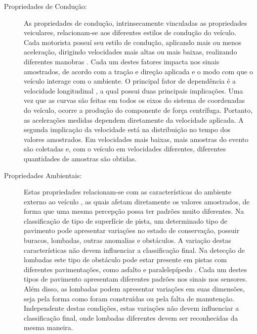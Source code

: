\begin{description}
	\item [Propriedades de Condução:] 
	
	As propriedades de condução, intrinsecamente vinculadas as propriedades veiculares, relacionam-se aos diferentes estilos de condução do veículo.  Cada motorista possuí seu estilo de condução, aplicando mais ou menos aceleração, dirigindo velocidades mais altas ou mais baixas, realizando diferentes manobras \cite{Alam2020}. Cada um destes fatores impacta nos sinais amostrados, de acordo com a tração e direção aplicada e o modo com que o veículo interage com o ambiente. O principal fator de dependência é a velocidade longitudinal \cite{Brunauer2016,Douangphachanh2013,Gueta2017,Kumar2017,Lima2016,M.2017,Nalavde2015,Singh2017,Alam2020}, a qual possui duas principais implicações. Uma vez que as curvas são feitas em todos os eixos do sistema de coordenadas do veículo, ocorre a produção do componente de força centrífuga. Portanto, as acelerações medidas dependem diretamente da velocidade aplicada. A segunda implicação da velocidade está na distribuição no tempo dos valores amostrados. Em velocidades mais baixas, mais amostras do evento são coletadas e, com o veículo em velocidades diferentes, diferentes quantidades de amostras são obtidas.

	\item [Propriedades Ambientais:] 
	
	Estas propriedades relacionam-se com as características do ambiente externo ao veículo \cite{Alam2020}, as quais afetam diretamente os valores amostrados, de forma que uma mesma percepção possa ter padrões muito diferentes. Na classificação de tipo de superfície de pista, um determinado tipo de pavimento pode apresentar variações no estado de conservação, possuir buracos, lombadas, outras anomalias e obstáculos. A variação destas características não devem influenciar a classificação final. Na detecção de lombadas este tipo de obstáculo pode estar presente em pistas com diferentes pavimentações, como asfalto e paralelepípedo \cite{Masino2017}. Cada um destes tipos de pavimento apresentam diferentes padrões nos sinais nos sensores. Além disso, as lombadas podem apresentar variações em suas dimensões, seja pela forma como foram construídas ou pela falta de manutenção. Independente destas condições, estas variações não devem influenciar a classificação final, onde lombadas diferentes devem ser reconhecidas da mesma maneira.
	 
\end{description}

